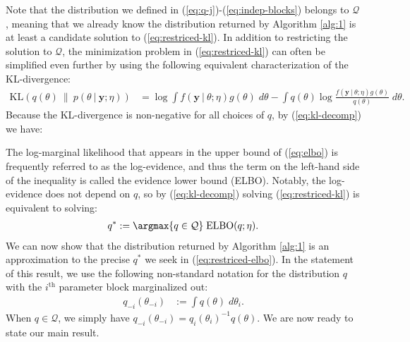 Note that the distribution we defined in (\ref{eq:q-j})-(\ref{eq:indep-blocks}) belongs to $\mathcal{Q}$, meaning that we already know the distribution returned by Algorithm \ref{alg:1} is at least a candidate solution to (\ref{eq:restriced-kl}). In addition to restricting the solution to $\mathcal{Q}$, the minimization problem in (\ref{eq:restriced-kl}) can often be simplified even further by using the following equivalent characterization of the KL-divergence: 
\begin{align}
     \text{KL}( q(\theta) \:\lVert\: p(\theta\:|\: \mathbf{y};\eta)) &= \log \int f(\mathbf{y}\:|\:\theta;\eta)g(\theta)\;d\theta - \int q(\theta) \log \frac{ f(\mathbf{y}\:|\: \theta;\eta) g(\theta)}{q(\theta)} \; d\theta. \label{eq:kl-decomp} 
\end{align}
Because the KL-divergence is non-negative for all choices of $q$, by (\ref{eq:kl-decomp}) we have:

The log-marginal likelihood that appears in the upper bound of (\ref{eq:elbo}) is frequently referred to as the log-evidence, and thus the term on the left-hand side of the inequality is called the evidence lower bound (ELBO). Notably, the log-evidence does not depend on $q$, so by (\ref{eq:kl-decomp}) solving (\ref{eq:restriced-kl}) is equivalent to solving: 
\begin{align}
    q^* := \argmax{q\in\mathcal{Q}}  \; \text{ELBO}(q;\eta).
\end{align}
We can now show that the distribution returned by Algorithm \ref{alg:1} is an approximation to the precise $q^*$ we seek in (\ref{eq:restriced-elbo}). In the statement of this result, we use the following non-standard notation for the distribution $q$ with the $i^{\text{th}}$ parameter block marginalized out:
\begin{align}
    q_{-i}(\theta_{-i}) &:= \int q(\theta) \; d\theta_i. \label{eq:q-minus-i}
\end{align}
When $q \in \mathcal{Q}$, we simply have $q_{-i}(\theta_{-i}) =q_{i}(\theta_{i})^{-1}q(\theta)$. We are now ready to state our main result.